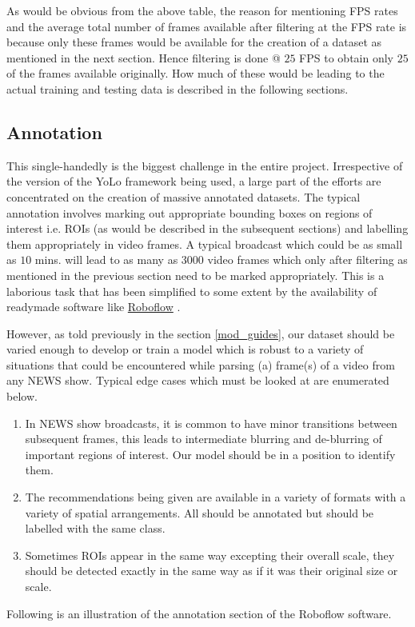 As would be obvious from the above table, the reason for mentioning FPS rates and the average total number of frames available after filtering at the FPS rate is because only these frames would be available for the creation of a dataset as mentioned in the next section. Hence filtering is done @ $25$ FPS to obtain only $25$ of the frames available originally. How much of these would be leading to the actual training and testing data is described in the following sections. \par

\subsection{Annotation}
This single-handedly is the biggest challenge in the entire project. Irrespective of the version of the YoLo framework being used, a large part of the efforts are concentrated on the creation of massive annotated datasets. The typical annotation involves marking out appropriate bounding boxes on regions of interest i.e. ROIs (as would be described in the subsequent sections) and labelling them appropriately in video frames. A typical broadcast which could be as small as $10$ mins. will lead to as many as $3000$ video frames which only after filtering as mentioned in the previous section need to be marked appropriately. This is a laborious task that has been simplified to some extent by the availability of readymade software like \href{https://roboflow.com/annotate}{Roboflow} \cite{rb2022}. \par

However, as told previously in the section \ref{mod_guides}, our dataset should be varied enough to develop or train a model which is robust to a variety of situations that could be encountered while parsing (a) frame(s) of a video from any NEWS show. Typical edge cases which must be looked at are enumerated below.
\begin{enumerate}
 \item In NEWS show broadcasts, it is common to have minor transitions between subsequent frames, this leads to intermediate blurring and de-blurring of important regions of interest. Our model should be in a position to identify them.
 \item The recommendations being given are available in a variety of formats with a variety of spatial arrangements. All should be annotated but should be labelled with the same class.
 \item Sometimes ROIs appear in the same way excepting their overall scale, they should be detected exactly in the same way as if it was their original size or scale.
\end{enumerate}
Following is an illustration of the annotation section of the Roboflow software.

